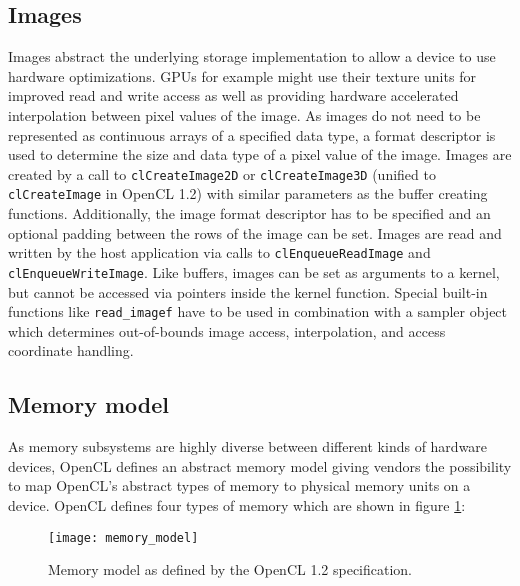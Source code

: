 \subsection{Images}
\label{sec:images}
Images abstract the underlying storage implementation to allow a device to use hardware optimizations. GPUs for example might use their texture units for improved read and write access as well as providing hardware accelerated interpolation between pixel values of the image. As images do not need to be represented as continuous arrays of a specified data type, a format descriptor is used to determine the size and data type of a pixel value of the image. Images are created by a call to \lstinline!clCreateImage2D! or \lstinline!clCreateImage3D! (unified to \lstinline!clCreateImage! in OpenCL 1.2) with similar parameters as the buffer creating functions. Additionally, the image format descriptor has to be specified and an optional padding between the rows of the image can be set. Images are read and written by the host application via calls to \lstinline!clEnqueueReadImage! and \lstinline!clEnqueueWriteImage!. Like buffers, images can be set as arguments to a kernel, but cannot be accessed via pointers inside the kernel function. Special built-in functions like \lstinline!read_imagef! have to be used in combination with a sampler object which determines out-of-bounds image access, interpolation, and access coordinate handling. \cite[pp.25]{opencl_book}

\subsection{Memory model}
As memory subsystems are highly diverse between different kinds of hardware devices, OpenCL defines an abstract memory model giving vendors the possibility to map OpenCL's abstract types of memory to physical memory units on a device.
OpenCL defines four types of memory which are shown in figure \ref{fig:memory_model}:

\begin{figure}[h]
\centering
\texttt{[image: memory\_model]}
\caption{Memory model as defined by the OpenCL 1.2 specification.\cite{opencl_spec}}
\label{fig:memory_model}
\end{figure}

